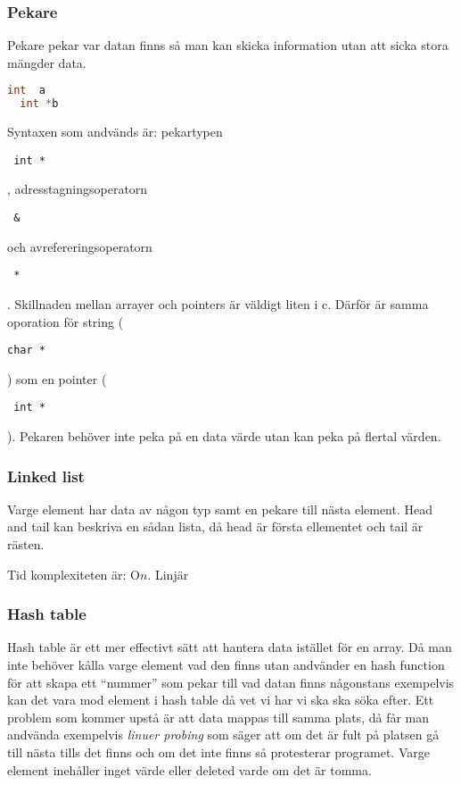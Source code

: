 \subsubsection{Pekare}
Pekare pekar var datan finns så man kan skicka information utan att sicka stora mängder data.

\begin{lstlisting}[language=C]
  int  a  
  int *b  
\end{lstlisting}
Syntaxen som andvänds är:
pekartypen \begin{verbatim} int * \end{verbatim}, adresstagningsoperatorn \begin{verbatim} & \end{verbatim} och avrefereringsoperatorn \begin{verbatim} * \end{verbatim}.
  Skillnaden mellan arrayer och pointers är väldigt liten i c.
  Därför är samma oporation för string (\begin{verbatim}char *\end{verbatim})
som en pointer (\begin{verbatim} int * \end{verbatim}). Pekaren behöver inte peka på en data värde utan kan peka på flertal värden.



\subsubsection{Linked list}
Varge element har data av någon typ samt en pekare till nästa element.
Head and tail kan beskriva en sådan lista, då head är första ellementet
och tail är rästen.

Tid komplexiteten är: O\(n\). Linjär


\subsubsection{Hash table}
Hash table är ett mer effectivt sätt att hantera data istället för en array.
Då man inte behöver kålla varge element vad den finns utan andvänder en hash
function för att skapa ett ``nummer'' som pekar till vad datan finns någonstans
exempelvis kan det vara mod element i hash table då vet vi har vi ska ska söka efter.
Ett problem som kommer upstå är att data mappas till samma plats, då får man andvända
exempelvis \emph{linuer probing} som säger att om det är fult på platsen gå till nästa tills
det finns och om det inte finns så protesterar programet. Varge element inehåller inget värde
eller deleted varde om det är tomma.

